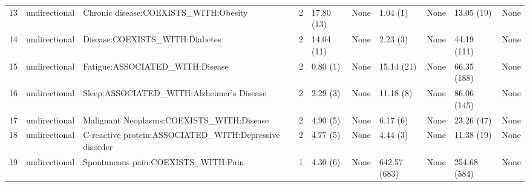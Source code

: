 \begin{tabular}{lllrllllll}
13 & undirectional & Chronic disease:COEXISTS_WITH:Obesity & 2 & 17.80 (13) & None & 1.04 (1) & None & 13.05 (19) & None \\
14 & undirectional & Disease:COEXISTS_WITH:Diabetes & 2 & 14.04 (11) & None & 2.23 (3) & None & 44.19 (111) & None \\
15 & undirectional & Fatigue:ASSOCIATED_WITH:Disease & 2 & 0.80 (1) & None & 15.14 (21) & None & 66.35 (188) & None \\
16 & undirectional & Sleep:ASSOCIATED_WITH:Alzheimer's Disease & 2 & 2.29 (3) & None & 11.18 (8) & None & 86.06 (145) & None \\
17 & undirectional & Malignant Neoplasms:COEXISTS_WITH:Disease & 2 & 4.90 (5) & None & 6.17 (6) & None & 23.26 (47) & None \\
18 & undirectional & C-reactive protein:ASSOCIATED_WITH:Depressive disorder & 2 & 4.77 (5) & None & 4.44 (3) & None & 11.38 (19) & None \\
19 & undirectional & Spontaneous pain:COEXISTS_WITH:Pain & 1 & 4.30 (6) & None & 642.57 (683) & None & 254.68 (584) & None \\
\end{tabular}
